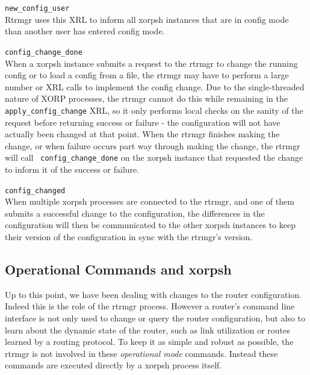 \documentclass[11pt]{article}
\begin{document}
\begin{description}

  \item{\tt new\_config\_user} \\Rtrmgr uses this XRL to inform all
  xorpsh instances that are in config mode than another user has entered
  config mode.

  \item{\tt config\_change\_done} \\When a xorpsh instance submits a
  request to the rtrmgr to change the running config or to load a config
  from a file, the rtrmgr may have to perform a large number or XRL calls
  to implement the config change.  Due to the single-threaded nature of
  XORP processes, the rtrmgr cannot do this while remaining in the {\tt
  apply\_config\_change} XRL, so it only performs local checks on the
  sanity of the request before returning success or failure - the
  configuration will not have actually been changed at that point.  When
  the rtrmgr finishes making the change, or when failure occurs part way
  through making the change, the rtrmgr will call {\tt
  config\_change\_done} on the xorpsh instance that requested the change
  to inform it of the success or failure.

  \item{\tt config\_changed} \\When multiple xorpsh processes are
  connected to the rtrmgr, and one of them submits a successful change
  to the configuration, the differences in the configuration will then
  be communicated to the other xorpsh instances to keep their version of
  the configuration in sync with the rtrmgr's version.

\end{description}

\subsection{Operational Commands and xorpsh}

Up to this point, we have been dealing with changes to the router
configuration.  Indeed this is the role of the rtrmgr process.
However a router's command line interface is not only used to change
or query the router configuration, but also to learn about the dynamic
state of the router, such as link utilization or routes learned by a
routing protocol.  To keep it as simple and robust as possible, the
rtrmgr is not involved in these \textit{operational mode} commands.
Instead these commands are executed directly by a xorpsh process
itself.
\end{document}
